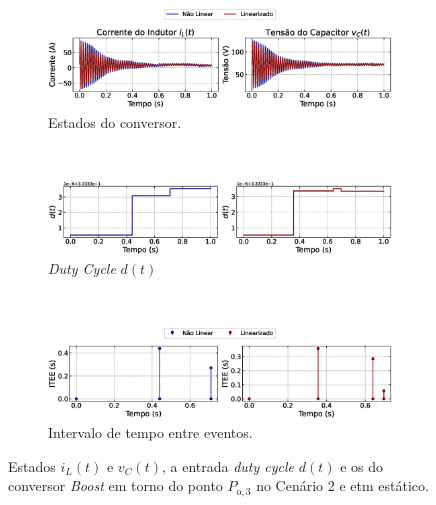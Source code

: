 \begin{figure}[H]
  \centering
  \captionsetup{justification=centering}
  \begin{subfigure}{1.\textwidth}
    \centering
    \includegraphics[width=1.\textwidth]{figuras/static-etm/boost/sim2/op1/result.eps}
    \caption{Estados do conversor.}
    \label{fig:boost_converter_variable_pcpl_static_etm_op1_duty_a}
  \end{subfigure}
  \\[6pt]
  \begin{subfigure}{1.\textwidth}
    \centering
    \includegraphics[width=1.\textwidth]{figuras/static-etm/boost/sim2/op1/duty-cycle.eps}
    \caption{\textit{Duty Cycle} $d(t)$}
    \label{fig:boost_converter_variable_pcpl_static_etm_op1_duty_b}
  \end{subfigure}
  \\[6pt]
  \begin{subfigure}{1.\textwidth}
    \centering
    \includegraphics[width=1.\textwidth]{figuras/static-etm/boost/sim2/op1/inter-event-times.eps}
    \caption{Intervalo de tempo entre eventos.}
    \label{fig:boost_converter_variable_pcpl_static_etm_op1_duty_c}
  \end{subfigure}
  \caption{Estados $i_L(t)$ e $v_C(t)$, a entrada \textit{duty cycle} $d(t)$ e os  do conversor \textit{Boost }em torno do ponto $P_{\mathrm{o}, 3}$ no Cenário 2 e \acrshort{etm} estático.}
\end{figure}

